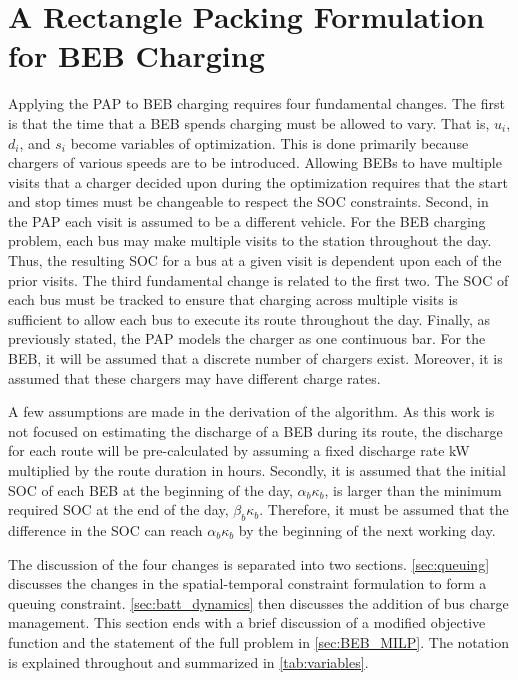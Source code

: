 \documentclass[ee,thesis]{usuthesis}
\begin{document}
\section{A Rectangle Packing Formulation for BEB Charging}
\label{sec:problemformulation}
Applying the PAP to BEB charging requires four fundamental changes. The first is that the time that a BEB spends
charging must be allowed to vary. That is, \(u_i\), \(d_i\), and \(s_i\) become variables of optimization. This is done
primarily because chargers of various speeds are to be introduced. Allowing BEBs to have multiple visits that a charger
decided upon during the optimization requires that the start and stop times must be changeable to respect the SOC
constraints. Second, in the PAP each visit is assumed to be a different vehicle. For the BEB charging problem, each bus
may make multiple visits to the station throughout the day. Thus, the resulting SOC for a bus at a given visit is
dependent upon each of the prior visits. The third fundamental change is related to the first two. The SOC of each bus
must be tracked to ensure that charging across multiple visits is sufficient to allow each bus to execute its route
throughout the day. Finally, as previously stated, the PAP models the charger as one continuous bar. For the BEB, it
will be assumed that a discrete number of chargers exist. Moreover, it is assumed that these chargers may have different
charge rates.

A few assumptions are made in the derivation of the algorithm. As this work is not focused on estimating the discharge
of a BEB during its route, the discharge for each route will be pre-calculated by assuming a fixed discharge rate kW
multiplied by the route duration in hours. Secondly, it is assumed that the initial SOC of each BEB at the beginning of
the day, $\alpha_b\kappa_b$, is larger than the minimum required SOC at the end of the day, $\beta_b\kappa_b$.
Therefore, it must be assumed that the difference in the SOC can reach $\alpha_b\kappa_b$ by the beginning of the next
working day.

The discussion of the four changes is separated into two sections. \autoref{sec:queuing} discusses the changes in the
spatial-temporal constraint formulation to form a queuing constraint. \autoref{sec:batt_dynamics} then discusses the
addition of bus charge management. This section ends with a brief discussion of a modified objective function and the
statement of the full problem in \autoref{sec:BEB_MILP}. The notation is explained throughout and summarized in
\autoref{tab:variables}.
\end{document}
